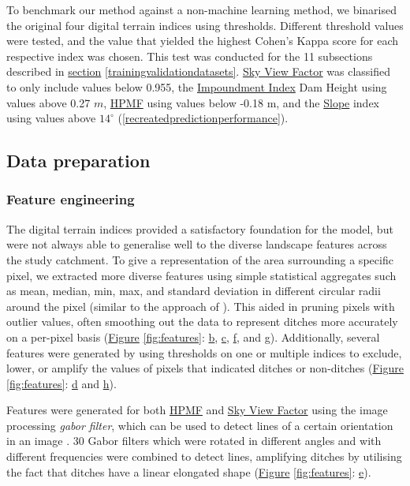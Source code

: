 \documentclass[11pt, review]{elsarticle} %
\begin{document}
\newpage
To benchmark our method against a non-machine learning method, we binarised the original four digital terrain indices using thresholds. Different threshold values were tested, and the value that yielded the highest Cohen's Kappa score for each respective index was chosen. This test was conducted for the 11 subsections described in \hyperref[trainingvalidationdatasets]{section} \ref{trainingvalidationdatasets}. \hyperref[skyviewfactor]{Sky View Factor} was classified to only include values below 0.955, the \hyperref[impoundment]{Impoundment Index} Dam Height using values above 0.27 $m$, \hyperref[hpmf]{HPMF} using values below -0.18 m, and the \hyperref[slope]{Slope} index using values above $14 ^{\circ}$ (\autoref{recreatedpredictionperformance}).

\subsection{Data preparation}

\subsubsection{Feature engineering}

The digital terrain indices provided a satisfactory foundation for the model, but were not always able to generalise well to the diverse landscape features across the study catchment. To give a representation of the area surrounding a specific pixel, we extracted more diverse features using simple statistical aggregates such as mean, median, min, max, and standard deviation in different circular radii around the pixel (similar to the approach of \citet{roelens}). This aided in pruning pixels with outlier values, often smoothing out the data to represent ditches more accurately on a per-pixel basis (\hyperref[fig:features]{Figure} \ref{fig:features}: \hyperref[fig:features]{b}, \hyperref[fig:features]{c}, \hyperref[fig:features]{f}, and \hyperref[fig:features]{g}). Additionally, several features were generated by using thresholds on one or multiple indices to exclude, lower, or amplify the values of pixels that indicated ditches or non-ditches (\hyperref[fig:features]{Figure} \ref{fig:features}: \hyperref[fig:features]{d} and \hyperref[fig:features]{h}).

Features were generated for both \hyperref[hpmf]{HPMF} and \hyperref[skyviewfactor]{Sky View Factor} using the image processing \textit{gabor filter}, which can be used to detect lines of a certain orientation in an image \citep{gabor}. 30 Gabor filters which were rotated in different angles and with different frequencies were combined to detect lines, amplifying ditches by utilising the fact that ditches have a linear elongated shape (\hyperref[fig:features]{Figure} \ref{fig:features}: \hyperref[fig:features]{e}).
\end{document}
